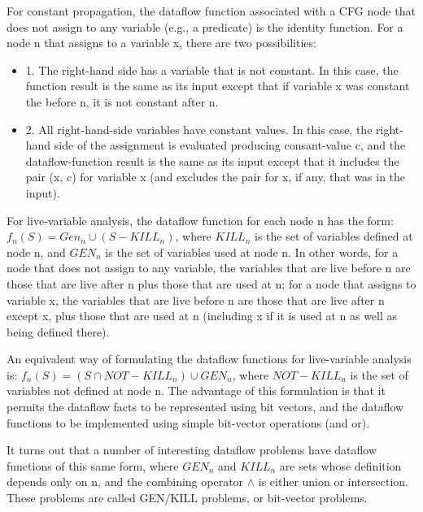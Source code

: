 For constant propagation, the dataflow function associated with a CFG node that does not assign
to any variable (e.g., a predicate) is the identity function. For a node n that assigns to
a variable x, there are two possibilities:

\begin{itemize}
	\item 1. The right-hand side has a variable that is not constant. In this case, the function
	      result is the same as its input except that if variable x was constant the before n,
	      it is not constant after n.
	\item 2. All right-hand-side variables have constant values. In this case, the right-hand side of
	      the assignment is evaluated producing consant-value c, and the dataflow-function result is the
	      same as its input except that it includes the pair (x, c) for variable x (and excludes the pair
	      for x, if any, that was in the input).
\end{itemize}


For live-variable analysis, the dataflow function for each node n has the form:
\(f_n(S) = Gen_n \cup (S - KILL_n)\), where \(KILL_n\) is the set of variables defined at node n,
and \(GEN_n\) is the set of variables used at node n. In other words, for a node that does not
assign to any variable, the variables that are live before n are those that are live after
n plus those that are used at n; for a node that assigns to variable x, the variables that are
live before n are those that are live after n except x, plus those that are used at n
(including x if it is used at n as well as being defined there).

An equivalent way of formulating the dataflow functions for live-variable analysis is:
\(f_n(S) = (S \cap NOT-KILL_n) \cup GEN_n\), where \(NOT-KILL_n\) is the set of variables not defined
at node n. The advantage of this formulation is that it permits the dataflow facts to be
represented using bit vectors, and the dataflow functions to be implemented using simple
bit-vector operations (and or).

It turns out that a number of interesting dataflow problems have dataflow functions of this
same form, where \(GEN_n\) and \(KILL_n\) are sets whose definition depends only on n, and the combining
operator \(\wedge\) is either union or intersection. These problems are called GEN/KILL problems,
or bit-vector problems.








